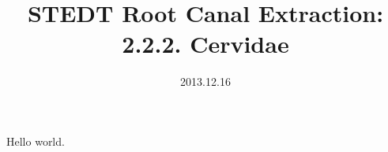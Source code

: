 \documentclass[11pt,twoside,twocolumn]{book}
\title{STEDT Root Canal Extraction:\\2.2.2. Cervidae}
\author{}
\date{2013.12.16}
\begin{document}
Hello world.



\cleardoublepage



\renewcommand{\bibname}{References}

\end{document}
